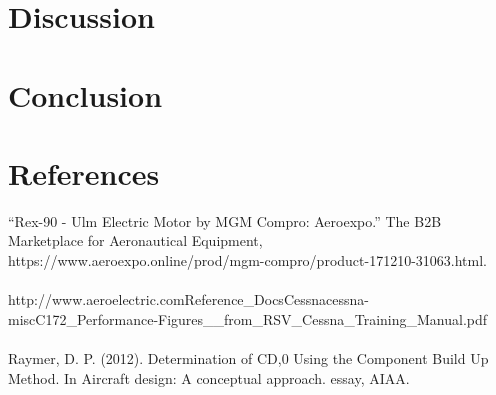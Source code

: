 \documentclass[12pt,A4paper]{article}
\begin{document}
	\section{Discussion}
	\clearpage
	\section{Conclusion}
	\clearpage
	\section{References}
	\sloppy
	“Rex-90 - Ulm Electric Motor by MGM Compro: Aeroexpo.” The B2B Marketplace for Aeronautical Equipment, https://www.aeroexpo.online/prod/mgm-compro/product-171210-31063.html. \\ \\
	http://www.aeroelectric.com\/Reference\_Docs\/Cessna\/cessna-misc\/C172\_Performance-Figures\_\_from\_RSV\_Cessna\_Training\_Manual.pdf \\ \\
	Raymer, D. P. (2012). Determination of CD,0 Using the Component Build Up Method. In Aircraft design: A conceptual approach. essay, AIAA. \\
	\clearpage
\end{document}
